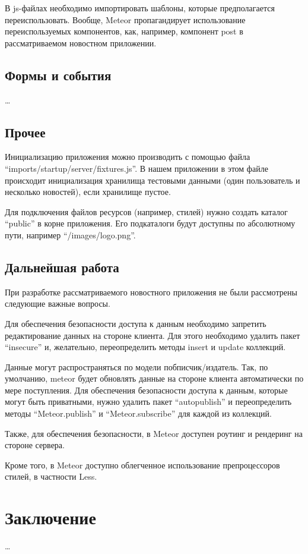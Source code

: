 \documentclass[a4paper,12pt]{article}
\begin{document}
В js-файлах необходимо импортировать шаблоны, которые предполагается переиспользовать.
Вообще, Meteor пропагандирует использование переиспользуемых компонентов, как, например,
компонент post в рассматриваемом новостном приложении.

\subsection{Формы и события}

\dots

\subsection{Прочее}
Инициализацию приложения можно производить с помощью файла
``imports/startup/server/fixtures.js''. В нашем приложении
в этом файле происходит инициализация хранилища тестовыми данными
(один пользователь и несколько новостей), если хранилище
пустое.

Для подключения файлов ресурсов (например, стилей) нужно
создать каталог ``public'' в корне приложения. Его
подкаталоги будут доступны по абсолютному пути,
например ``/images/logo.png''.

\subsection{Дальнейшая работа}
При разработке рассматриваемого новостного приложения не были
рассмотрены следующие важные вопросы.

Для обеспечения безопасности доступа к данным необходимо
запретить редактирование данных на стороне клиента.
Для этого необходимо удалить пакет ``insecure''
и, желательно, переопределить методы insert и update
коллекций.

Данные могут распространяться по модели побписчик/издатель.
Так, по умолчанию, meteor будет обновлять данные
на стороне клиента автоматически по мере поступления.
Для обеспечения безопасности доступа к данным, 
которые могут быть приватными, нужно удалить пакет 
``autopublish'' и переопределить методы
``Meteor.publish'' и ``Meteor.subscribe'' для
каждой из коллекций.

Также, для обеспечения безопасности,
в Meteor доступен роутинг и рендеринг 
на стороне сервера.

Кроме того, в Meteor доступно облегченное использование препроцессоров стилей,
в частности Less.

\section*{Заключение}
\dots

\begin{thebibliography}{99}
	
\end{thebibliography}
\end{document}
